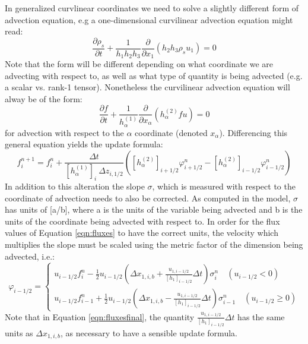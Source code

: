 \documentclass[11pt,letterpaper]{article}
\begin{document}
In generalized curvlinear coordinates we need to solve a slightly different form of advection equation, e.g a one-dimensional curvilinear advection equation might read:
\begin{equation}
\frac{\partial \rho_s}{\partial t} + \frac{1}{h_1 h_2 h_3} \frac{\partial}{\partial x_1} \left( h_2 h_3 \rho_s u_1 \right)  = 0
\end{equation}
Note that the form will be different depending on what coordinate we are advecting with respect to, as well as what type of quantity is being advected (e.g. a scalar vs. rank-1 tensor).  Nonetheless the curvilinear advection equation will alway be of the form:
\begin{equation}
\frac{\partial f}{\partial t} + \frac{1}{h_\alpha^{(1)}} \frac{\partial}{\partial x_\alpha} \left( h_\alpha^{(2)} f u \right)  = 0
\end{equation}
for advection with respect to the $\alpha$ coordinate (denoted $x_\alpha$).  Differencing this general equation yields the update formula:
\begin{equation}
f^{n+1}_i = f^n_i + \frac{\Delta t}{ \left[ h_\alpha^{(1)} \right]_i ~ \Delta z_{i,1/2}} \left( \left[ h_\alpha^{(2)} \right]_{i+1/2} \varphi_{i+1/2}^n - \left[ h_\alpha^{(2)} \right]_{i-1/2} \varphi_{i-1/2}^n \right)
\end{equation}
In addition to this alteration the slope $\sigma$, which is measured with respect to the coordinate of advection needs to also be corrected.  As computed in the model, $\sigma$ has units of [a/b], where a is the units of the variable being advected and b is the units of the coordinate being advected with respect to.  In order for the flux values of Equation \ref{eqn:fluxes} to have the correct units, the velocity which multiplies the slope must be scaled using the metric factor of the dimension being advected, i.e.:
\begin{equation}
\varphi_{i-1/2} = \left\{ \begin{array}{c} 
u_{i-1/2} f_{i}^n - \frac{1}{2} u_{i-1/2} \left( \Delta x_{1,i,b} + \frac{u_{1,i-1/2}}{\left[ h_1 \right]_{i-1/2}} \Delta t \right) \sigma_i^n \quad (u_{i-1/2}  < 0) \\
u_{i-1/2} f_{i-1}^n + \frac{1}{2} u_{i-1/2} \left( \Delta x_{1,i,b} - \frac{u_{1,i-1/2}}{\left[ h_1 \right]_{i-1/2}} \Delta t \right) \sigma_{i-1}^n \quad (u_{i-1/2}  \ge 0)
\end{array} \right. \label{eqn:fluxesfinal}
\end{equation} 
Note that in Equation \ref{eqn:fluxesfinal}, the quantity $\frac{u_{1,i-1/2}}{\left[ h_1 \right]_{i-1/2} } \Delta t$ has the same units as $\Delta x_{1,i,b}$, as necessary to have a sensible update formula. 
\end{document}
